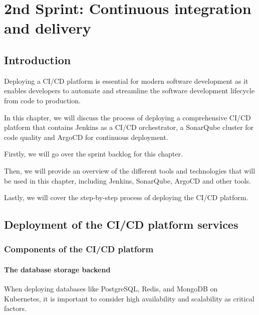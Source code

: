\graphicspath{{./assets/}}
\setcounter{mtc}{3}
\chapter{2nd Sprint: Continuous integration and delivery }

\minitoc
\newpage
\section*{Introduction}
Deploying a CI/CD platform is essential for modern software development as it enables developers to automate and streamline the software development lifecycle from code to production. 

In this chapter, we will discuss the process of deploying a comprehensive CI/CD platform that contains Jenkins as a CI/CD orchestrator, a SonarQube cluster for code quality and ArgoCD for continuous deployment. 

Firstly, we will go over the sprint backlog for this chapter. 

Then, we will provide an overview of the different tools and technologies that will be used in this chapter, including Jenkins, SonarQube, ArgoCD and other tools. 

Lastly, we will cover the step-by-step process of deploying the CI/CD platform.

\section{Deployment of the CI/CD platform services}
\subsection{Components of the CI/CD platform }

\subsubsection{The database storage backend }

When deploying databases like PostgreSQL, Redis, and MongoDB on Kubernetes, it is important to consider high availability and scalability as critical factors. 

